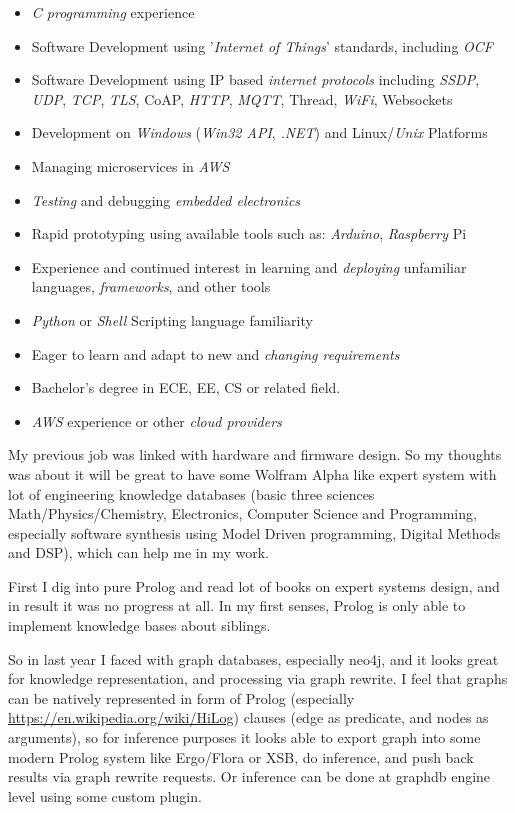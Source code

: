 \begin{framed}\noindent
\begin{itemize}[nosep]
\item \emph{C programming} experience
\item Software Development using '\emph{Internet of Things}' standards, including \emph{OCF}
\item Software Development using IP based \emph{internet protocols} including \emph{SSDP}, \emph{UDP}, \emph{TCP}, \emph{TLS}, CoAP, \emph{HTTP}, \emph{MQTT}, Thread, \emph{WiFi}, Websockets
\item Development on \emph{Windows} (\emph{Win32 API}, \emph{.NET}) and Linux/\emph{Unix} Platforms
\item Managing microservices in \emph{AWS}
\item \emph{Testing} and debugging \emph{embedded electronics}
\item Rapid prototyping using available tools such as: \emph{Arduino}, \emph{Raspberry} Pi
\item Experience and continued interest in learning and \emph{deploying} unfamiliar languages, \emph{frameworks}, and other tools
\item \emph{Python} or \emph{Shell} Scripting language familiarity
\item Eager to learn and adapt to new and \emph{changing requirements}
\item Bachelor's degree in ECE, EE, CS or related field.
\item \emph{AWS} experience or other \emph{cloud providers}
\end{itemize}
\end{framed}

My previous job was linked with hardware and firmware design. So my thoughts was about it will be great to have some Wolfram Alpha like expert system with lot of engineering knowledge databases (basic three sciences Math/Physics/Chemistry, Electronics, Computer Science and Programming, especially software synthesis using Model Driven programming, Digital Methods and DSP), which can help me in my work.

First I dig into pure Prolog and read lot of books on expert systems design, and in result it was no progress at all. In my first senses, Prolog is only able to implement knowledge bases about siblings.

So in last year I faced with graph databases, especially neo4j, and it looks great for knowledge representation, and processing via graph rewrite. I feel that graphs can be natively represented in form of Prolog (especially \href{HiLog}{https://en.wikipedia.org/wiki/HiLog}) clauses (edge as predicate, and nodes as arguments), so for inference purposes it looks able to export graph into some modern Prolog system like Ergo/Flora or XSB, do inference, and push back results via graph rewrite requests. Or inference can be done at graphdb engine level using some custom plugin.

